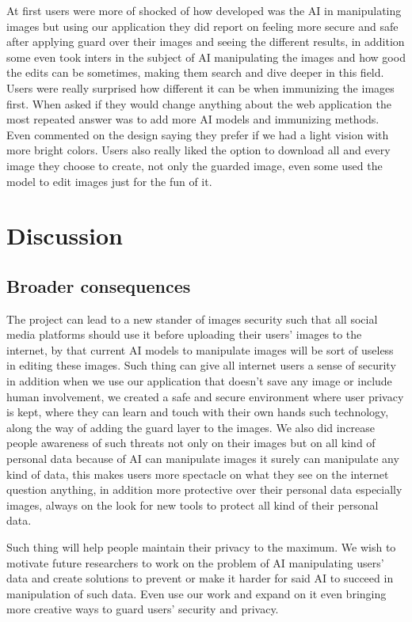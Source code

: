 \documentclass[sigconf]{acmart}
\begin{document}
At first users were more of shocked of how developed was the AI in manipulating images but using our application they did report on feeling more secure and safe after applying guard over their images and seeing the different results, in addition some even took inters in the subject of AI manipulating the images and how good the edits can be sometimes, making them search and dive deeper in this field. Users were really surprised how different it can be when immunizing the images first. When asked if they would change anything about the web application the most repeated answer was to add more AI models and immunizing methods. Even commented on the design saying they prefer if we had a light vision with more bright colors. Users also really liked the option to download all and every image they choose to create, not only the guarded image, even some used the model to edit images just for the fun of it.

\section{Discussion}

\subsection{Broader consequences}

The project can lead to a new stander of images security such that all social media platforms should use it before uploading their users' images to the internet, by that current AI models to manipulate images will be  sort of useless in editing these images. Such thing can give all internet users a sense of security in addition when we use our application that doesn't save any image or include human involvement, we created a safe and secure environment where user privacy is kept, where they can learn and touch with their own hands such technology, along the way of adding the guard layer to the images. We also did increase people awareness of such threats not only on their images but on all kind of personal data because of AI can manipulate images it surely can manipulate any kind of data, this makes users more spectacle on what they see on the internet question anything, in addition more protective over their personal data especially images, always on the look for new tools to protect all kind of their personal data. 

Such thing will help people maintain their privacy to the maximum.  
We wish to motivate future researchers to work on the problem of AI manipulating users' data and create solutions to prevent or make it harder for said AI to succeed in manipulation of such data. Even use our work and expand on it even bringing more creative ways to guard users' security and privacy.      
\end{document}
